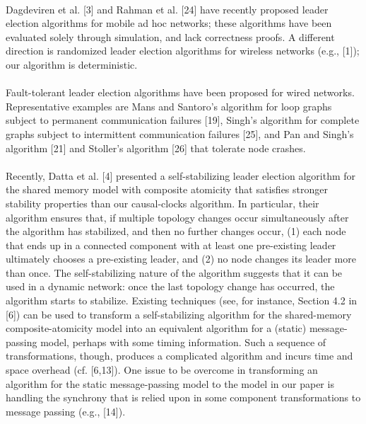 \paragraph{}Dagdeviren et al. [3] and Rahman et al. [24] have recently proposed leader election algorithms for mobile ad hoc networks; these algorithms have been evaluated solely through simulation, and lack correctness proofs. A different direction is randomized leader election algorithms for wireless networks (e.g., [1]); our algorithm is deterministic.
\paragraph{}Fault-tolerant leader election algorithms have been proposed for wired networks. Representative examples are Mans and Santoro’s algorithm for loop graphs subject to permanent communication failures [19], Singh’s algorithm for complete graphs subject to intermittent communication failures [25], and Pan and Singh’s algorithm [21] and Stoller’s algorithm [26] that tolerate node crashes.
\paragraph{}Recently, Datta et al. [4] presented a self-stabilizing leader election algorithm for the shared memory model with composite atomicity that satisfies stronger stability properties than our causal-clocks algorithm. In particular, their algorithm ensures that, if multiple topology changes occur simultaneously after the algorithm has stabilized, and then no further changes occur, (1) each node that ends up in a connected component with at least one pre-existing leader ultimately chooses a pre-existing leader, and (2) no node changes its leader more than once. The self-stabilizing nature of the algorithm suggests that it can be used in a dynamic network: once the last topology change has occurred, the algorithm starts to stabilize. Existing techniques (see, for instance, Section 4.2 in [6]) can be used to transform a self-stabilizing algorithm for the shared-memory composite-atomicity model into an equivalent algorithm for a (static) message-passing model, perhaps with some timing information. Such a sequence of transformations, though, produces a complicated algorithm and incurs time and space overhead (cf. [6,13]). One issue to be overcome in transforming an algorithm for the static message-passing model to the model in our paper is handling the synchrony that is relied upon in some component transformations to message passing (e.g., [14]).




